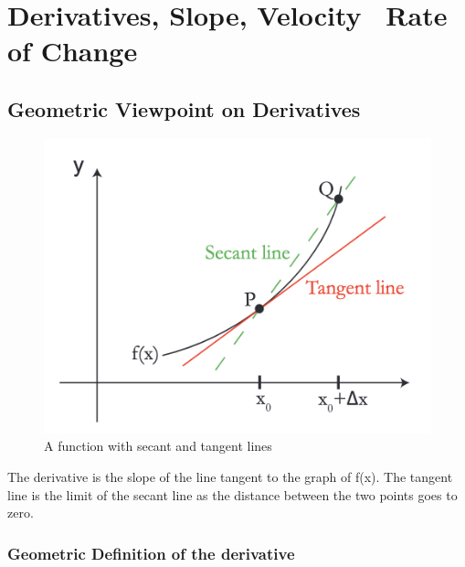 

\chapter{Derivatives, Slope, Velocity \ Rate of Change}  

\bigbreak
\section{Geometric Viewpoint on Derivatives}

\begin{figure}[ht!]
	\centering
	\includegraphics[scale=0.3]{./images/lecture_1_figure_1.png}
	\caption{A function with secant and tangent lines}
\end{figure}

The derivative is the slope of the line tangent to the graph of f(x).
The tangent line is the limit of the secant line as the distance between the two points goes to zero.

\subsection{Geometric Definition of the derivative}

